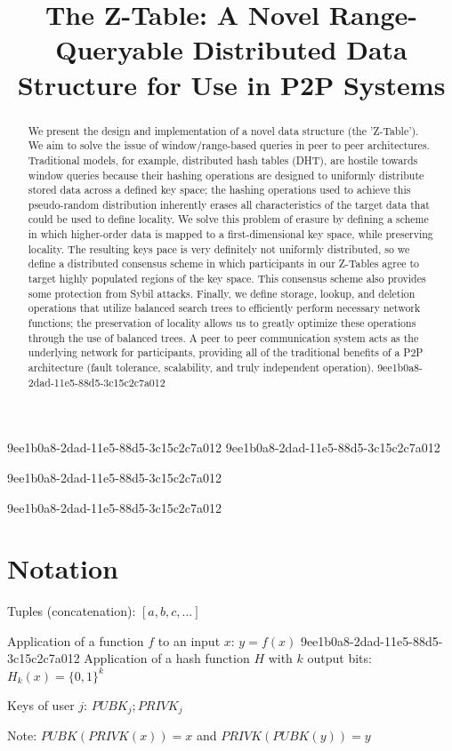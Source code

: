 \documentclass[12pt]{article}
\title{The Z-Table: A Novel Range-Queryable Distributed Data Structure for Use in P2P Systems}
\begin{document}
9ee1b0a8-2dad-11e5-88d5-3c15c2c7a012
9ee1b0a8-2dad-11e5-88d5-3c15c2c7a012\maketitle

9ee1b0a8-2dad-11e5-88d5-3c15c2c7a012\begin{abstract}
We present the design and implementation of a novel data structure (the 'Z-Table'). We aim to solve the issue of window/range-based queries in peer to peer architectures. Traditional models, for example,  distributed hash tables (DHT), are hostile towards window queries because their hashing operations are designed to uniformly distribute stored data across a defined key space; the hashing operations used to achieve this pseudo-random distribution inherently erases all characteristics of the target data that could be used to define locality. We solve this problem of erasure by defining a scheme in which higher-order data is mapped to a first-dimensional key space, while preserving locality. The resulting keys pace is very definitely not uniformly distributed, so we define a distributed consensus scheme in which participants in our Z-Tables agree to target highly populated regions of the key space. This consensus scheme also provides some protection from Sybil attacks. Finally, we define storage, lookup, and deletion operations that utilize balanced search trees to efficiently perform necessary network functions; the preservation of locality allows us to greatly optimize these operations through the use of balanced trees. A peer to peer communication system acts as the underlying network for participants, providing all of the traditional benefits of a P2P architecture (fault tolerance, scalability, and truly independent operation).
9ee1b0a8-2dad-11e5-88d5-3c15c2c7a012\end{abstract}
9ee1b0a8-2dad-11e5-88d5-3c15c2c7a012
\section{Notation}

Tuples (concatenation): $[a,b,c,...]$

Application of a function $f$ to an input $x$: $y=f(x)$
9ee1b0a8-2dad-11e5-88d5-3c15c2c7a012
Application of a hash function $H$ with $k$ output bits: $H_{k}(x) = \{0,1\}^k$

Keys of user $j$: $ PUBK_j; PRIVK_j $

Note: $PUBK(PRIVK(x)) = x$ and $PRIVK(PUBK(y)) = y$~
\end{document}
